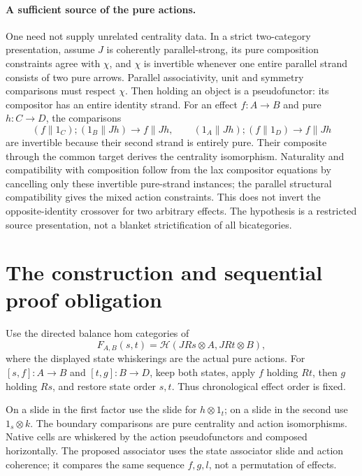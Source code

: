 \documentclass[11pt]{article}
\begin{document}
\paragraph{A sufficient source of the pure actions.}
One need not supply unrelated centrality data. In a strict two-category presentation, assume $J$ is coherently parallel-strong, its pure composition constraints agree with $\chi$, and $\chi$ is invertible whenever one entire parallel strand consists of two pure arrows. Parallel associativity, unit and symmetry comparisons must respect $\chi$. Then holding an object is a pseudofunctor: its compositor has an entire identity strand. For an effect $f:A\to B$ and pure $h:C\to D$, the comparisons
\[
 (f\parallel1_C);(1_B\parallel Jh)\longrightarrow f\parallel Jh,
 \qquad
 (1_A\parallel Jh);(f\parallel1_D)\longrightarrow f\parallel Jh
\]
are invertible because their second strand is entirely pure. Their composite through the common target derives the centrality isomorphism. Naturality and compatibility with composition follow from the lax compositor equations by cancelling only these invertible pure-strand instances; the parallel structural compatibility gives the mixed action constraints. This does not invert the opposite-identity crossover for two arbitrary effects. The hypothesis is a restricted source presentation, not a blanket strictification of all bicategories.

\section{The construction and sequential proof obligation}
Use the directed balance hom categories of
\[
 F_{A,B}(s,t)=\mathcal H(JRs\otimes A,JRt\otimes B),
\]
where the displayed state whiskerings are the actual pure actions. For $[s,f]:A\to B$ and $[t,g]:B\to D$, keep both states, apply $f$ holding $Rt$, then $g$ holding $Rs$, and restore state order $s,t$. Thus chronological effect order is fixed.

On a slide in the first factor use the slide for $h\otimes1_t$; on a slide in the second use $1_s\otimes k$. The boundary comparisons are pure centrality and action isomorphisms. Native cells are whiskered by the action pseudofunctors and composed horizontally. The proposed associator uses the state associator slide and action coherence; it compares the same sequence $f,g,l$, not a permutation of effects.
\end{document}

